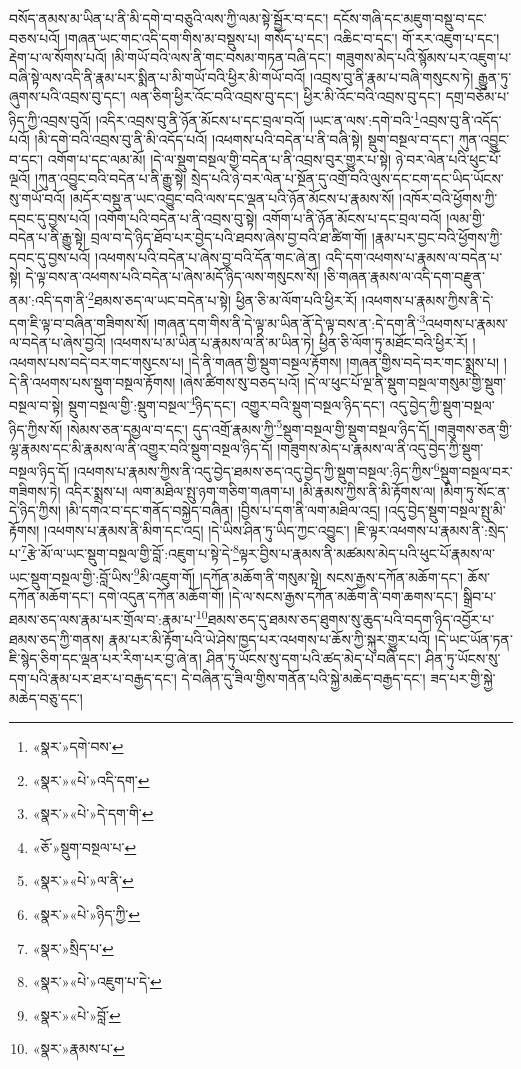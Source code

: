 བསོད་ནམས་མ་ཡིན་པ་ནི་མི་དགེ་བ་བཅུའི་ལས་ཀྱི་ལམ་སྟེ་སྦྱོར་བ་དང་། དངོས་གཞི་དང་མཇུག་བསྡུ་བ་དང་བཅས་པའོ། །གཞན་ཡང་གང་འདི་དག་གིས་མ་བསྡུས་པ། གསོད་པ་དང་། འཆིང་བ་དང་། གོ་རར་འཇུག་པ་དང་། རྡེག་པ་ལ་སོགས་པའོ། །མི་གཡོ་བའི་ལས་ནི་གང་བསམ་གཏན་བཞི་དང་། གཟུགས་མེད་པའི་སྙོམས་པར་འཇུག་པ་བཞི་སྟེ་ལས་འདི་ནི་རྣམ་པར་སྨིན་པ་མི་གཡོ་བའི་ཕྱིར་མི་གཡོ་བའོ། །འབྲས་བུ་ནི་རྣམ་པ་བཞི་གསུངས་ཏེ། རྒྱུན་ཏུ་ཞུགས་པའི་འབྲས་བུ་དང་། ལན་ཅིག་ཕྱིར་འོང་བའི་འབྲས་བུ་དང་། ཕྱིར་མི་འོང་བའི་འབྲས་བུ་དང་། དགྲ་བཅོམ་པ་ཉིད་ཀྱི་འབྲས་བུའོ། །འདིར་འབྲས་བུ་ནི་ཉོན་མོངས་པ་དང་བྲལ་བའོ། །ཡང་ན་ལས་:དགེ་བའི་\footnote{«སྣར་»དགེ་བས་}འབྲས་བུ་ནི་འདོད་པའོ། །མི་དགེ་བའི་འབྲས་བུ་ནི་མི་འདོད་པའོ། །འཕགས་པའི་བདེན་པ་ནི་བཞི་སྟེ། སྡུག་བསྔལ་བ་དང་། ཀུན་འབྱུང་བ་དང་། འགོག་པ་དང་ལམ་མོ། །དེ་ལ་སྡུག་བསྔལ་གྱི་བདེན་པ་ནི་འབྲས་བུར་གྱུར་པ་སྟེ། ཉེ་བར་ལེན་པའི་ཕུང་པོ་ལྔའོ། །ཀུན་འབྱུང་བའི་བདེན་པ་ནི་རྒྱུ་སྟེ། སྲེད་པའི་ཉེ་བར་ལེན་པ་སྔོན་དུ་འགྲོ་བའི་ལུས་དང་ངག་དང་ཡིད་ཡོངས་སུ་གཡོ་བའོ། །མདོར་བསྡུ་ན་ཡང་འབྱུང་བའི་ལས་དང་ལྡན་པའི་ཉོན་མོངས་པ་རྣམས་སོ། །འཁོར་བའི་ཕྱོགས་ཀྱི་དབང་དུ་བྱས་པའོ། །འགོག་པའི་བདེན་པ་ནི་འབྲས་བུ་སྟེ། འགོག་པ་ནི་ཉོན་མོངས་པ་དང་བྲལ་བའོ། །ལམ་གྱི་བདེན་པ་ནི་རྒྱུ་སྟེ། བྲལ་བ་དེ་ཉིད་ཐོབ་པར་བྱེད་པའི་ཐབས་ཞེས་བྱ་བའི་ཐ་ཚིག་གོ། །རྣམ་པར་བྱང་བའི་ཕྱོགས་ཀྱི་དབང་དུ་བྱས་པའོ། །འཕགས་པའི་བདེན་པ་ཞེས་བྱ་བའི་དོན་གང་ཞེ་ན། འདི་དག་འཕགས་པ་རྣམས་ལ་བདེན་པ་སྟེ། དེ་ལྟ་བས་ན་འཕགས་པའི་བདེན་པ་ཞེས་མདོ་ཉིད་ལས་གསུངས་སོ། །ཅི་གཞན་རྣམས་ལ་འདི་དག་བརྫུན་ནམ་:འདི་དག་ནི་\footnote{«སྣར་»«པེ་»འདི་དག་}ཐམས་ཅད་ལ་ཡང་བདེན་པ་སྟེ། ཕྱིན་ཅི་མ་ལོག་པའི་ཕྱིར་རོ། །འཕགས་པ་རྣམས་ཀྱིས་ནི་དེ་དག་ཇི་ལྟ་བ་བཞིན་གཟིགས་སོ། །གཞན་དག་གིས་ནི་དེ་ལྟ་མ་ཡིན་ནོ་དེ་ལྟ་བས་ན་:དེ་དག་ནི་\footnote{«སྣར་»«པེ་»དེ་དག་གི་}འཕགས་པ་རྣམས་ལ་བདེན་པ་ཞེས་བྱའོ། །འཕགས་པ་མ་ཡིན་པ་རྣམས་ལ་ནི་མ་ཡིན་ཏེ། ཕྱིན་ཅི་ལོག་ཏུ་མཐོང་བའི་ཕྱིར་རོ། །འཕགས་པས་བདེ་བར་གང་གསུངས་པ། །དེ་ནི་གཞན་གྱི་སྡུག་བསྔལ་རྟོགས། །གཞན་གྱིས་བདེ་བར་གང་སྨྲས་པ། །དེ་ནི་འཕགས་པས་སྡུག་བསྔལ་རྟོགས། །ཞེས་ཚིགས་སུ་བཅད་པའོ། །དེ་ལ་ཕུང་པོ་ལྔ་ནི་སྡུག་བསྔལ་གསུམ་གྱི་སྡུག་བསྔལ་བ་སྟེ། སྡུག་བསྔལ་གྱི་:སྡུག་བསྔལ་\footnote{«ཅོ་»སྡུག་བསྔལ་པ་}ཉིད་དང་། འགྱུར་བའི་སྡུག་བསྔལ་ཉིད་དང་། འདུ་བྱེད་ཀྱི་སྡུག་བསྔལ་ཉིད་ཀྱིས་སོ། །སེམས་ཅན་དམྱལ་བ་དང་། དུད་འགྲོ་རྣམས་ཀྱི་\footnote{«སྣར་»«པེ་»ལ་ནི་}སྡུག་བསྔལ་གྱི་སྡུག་བསྔལ་ཉིད་དོ། །གཟུགས་ཅན་གྱི་ལྷ་རྣམས་དང་མི་རྣམས་ལ་ནི་འགྱུར་བའི་སྡུག་བསྔལ་ཉིད་དོ། །གཟུགས་མེད་པ་རྣམས་ལ་ནི་འདུ་བྱེད་ཀྱི་སྡུག་བསྔལ་ཉིད་དོ། །འཕགས་པ་རྣམས་ཀྱིས་ནི་འདུ་བྱེད་ཐམས་ཅད་འདུ་བྱེད་ཀྱི་སྡུག་བསྔལ་:ཉིད་ཀྱིས་\footnote{«སྣར་»«པེ་»ཉིད་ཀྱི་}སྡུག་བསྔལ་བར་གཟིགས་ཏེ། འདིར་སྨྲས་པ། ལག་མཐིལ་སྤུ་ཉག་གཅིག་གཞག་པ། །མི་རྣམས་ཀྱིས་ནི་མི་རྟོགས་ལ། །མིག་ཏུ་སོང་ན་དེ་ཉིད་ཀྱིས། །མི་དགའ་བ་དང་གནོད་བསྐྱེད་བཞིན། །བྱིས་པ་དག་ནི་ལག་མཐིལ་འདྲ། །འདུ་བྱེད་སྡུག་བསྔལ་སྤུ་མི་རྟོགས། །འཕགས་པ་རྣམས་ནི་མིག་དང་འདྲ། །དེ་ཡིས་ཤིན་ཏུ་ཡིད་ཀྱང་འབྱུང་། །ཇི་ལྟར་འཕགས་པ་རྣམས་ནི་:སྲེད་པ་\footnote{«སྣར་»སྲིད་པ་}རྩེ་མོ་ལ་ཡང་སྡུག་བསྔལ་གྱི་བློ་:འཇུག་པ་སྟེ་དེ་\footnote{«སྣར་»«པེ་»འཇུག་པ་དེ་}ལྟར་བྱིས་པ་རྣམས་ནི་མཚམས་མེད་པའི་ཕུང་པོ་རྣམས་ལ་ཡང་སྡུག་བསྔལ་གྱི་:བློ་ཡིས་\footnote{«སྣར་»«པེ་»བློ་}མི་འཇུག་གོ། །དཀོན་མཆོག་ནི་གསུམ་སྟེ། སངས་རྒྱས་དཀོན་མཆོག་དང་། ཆོས་དཀོན་མཆོག་དང་། དགེ་འདུན་དཀོན་མཆོག་གོ། །དེ་ལ་སངས་རྒྱས་དཀོན་མཆོག་ནི་བག་ཆགས་དང་། སྒྲིབ་པ་ཐམས་ཅད་ལས་རྣམ་པར་གྲོལ་བ་:རྣམ་པ་\footnote{«སྣར་»རྣམས་པ་}ཐམས་ཅད་དུ་ཐམས་ཅད་ཐུགས་སུ་ཆུད་པའི་བདག་ཉིད་འབྱོར་པ་ཐམས་ཅད་ཀྱི་གནས། རྣམ་པར་མི་རྟོག་པའི་ཡེ་ཤེས་ཁྱད་པར་འཕགས་པ་ཆོས་ཀྱི་སྐུར་གྱུར་པའོ། །དེ་ཡང་ཡོན་ཏན་ཇི་སྙེད་ཅིག་དང་ལྡན་པར་རིག་པར་བྱ་ཞེ་ན། ཤིན་ཏུ་ཡོངས་སུ་དག་པའི་ཚད་མེད་པ་བཞི་དང་། ཤིན་ཏུ་ཡོངས་སུ་དག་པའི་རྣམ་པར་ཐར་པ་བརྒྱད་དང་། དེ་བཞིན་དུ་ཟིལ་གྱིས་གནོན་པའི་སྐྱེ་མཆེད་བརྒྱད་དང་། ཟད་པར་གྱི་སྐྱེ་མཆེད་བཅུ་དང་། 